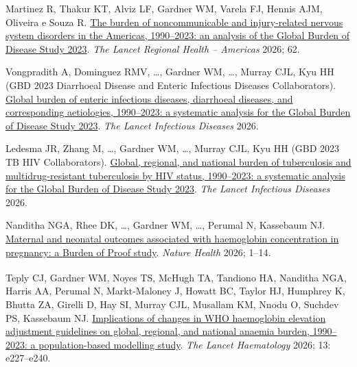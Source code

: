 \documentclass[11pt,article,oneside]{memoir}
\begin{document}
\begin{publist}


\item Martinez R, Thakur KT, Alviz LF, {\minbold Gardner WM}, Varela FJ, Hennis AJM, Oliveira e Souza R. \href{https://doi.org/10.1016/j.lana.2026.101581}{The burden of noncommunicable and injury-related nervous system disorders in the Americas, 1990–2023: an analysis of the Global Burden of Disease Study 2023}. \emph{The Lancet Regional Health – Americas} 2026; 62.

\item Vongpradith A, Dominguez RMV, \ldots, {\minbold Gardner WM}, \ldots, Murray CJL, Kyu HH (GBD 2023 Diarrhoeal Disease and Enteric Infectious Diseases Collaborators). \href{https://doi.org/10.1016/S1473-3099(26)00194-5}{Global burden of enteric infectious diseases, diarrhoeal diseases, and corresponding aetiologies, 1990–2023: a systematic analysis for the Global Burden of Disease Study 2023}. \emph{The Lancet Infectious Diseases} 2026.

\item Ledesma JR, Zhang M, \ldots, {\minbold Gardner WM}, \ldots, Murray CJL, Kyu HH (GBD 2023 TB HIV Collaborators). \href{https://doi.org/10.1016/S1473-3099(26)00295-1}{Global, regional, and national burden of tuberculosis and multidrug-resistant tuberculosis by HIV status, 1990–2023: a systematic analysis for the Global Burden of Disease Study 2023}. \emph{The Lancet Infectious Diseases} 2026.

\item Nanditha NGA, Rhee DK, \ldots, {\minbold Gardner WM}, \ldots, Perumal N, Kassebaum NJ. \href{https://doi.org/10.1038/s44360-026-00129-7}{Maternal and neonatal outcomes associated with haemoglobin concentration in pregnancy: a Burden of Proof study}. \emph{Nature Health} 2026; 1--14.

\item Teply CJ\textsuperscript{\textdagger}, {\minbold Gardner WM}\textsuperscript{\textdagger}, Noyes TS, McHugh TA, Tandiono HA, Nanditha NGA, Harris AA, Perumal N, Markt-Maloney J, Howatt BC, Taylor HJ, Humphrey K, Bhutta ZA, Girelli D, Hay SI, Murray CJL, Musallam KM, Nnodu O, Suchdev PS, Kassebaum NJ. \href{https://doi.org/10.1016/S2352-3026(26)00013-X}{Implications of changes in WHO haemoglobin elevation adjustment guidelines on global, regional, and national anaemia burden, 1990–2023: a population-based modelling study}. \emph{The Lancet Haematology} 2026; 13: e227--e240.


\end{publist}
\end{document}
